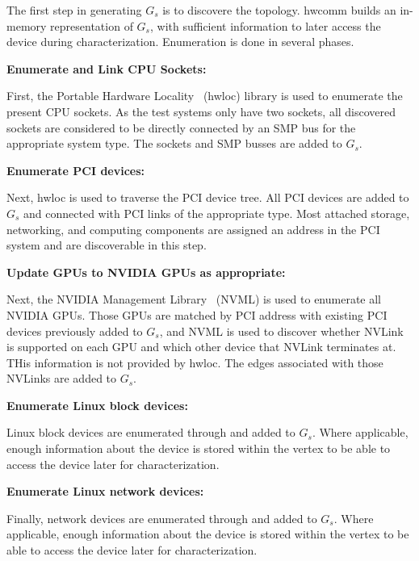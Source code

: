 The first step in generating $G_s$ is to discovere the topology.
hwcomm builds an in-memory representation of $G_s$, with sufficient information to later access the device during characterization.
Enumeration is done in several phases.

\textbf{Enumerate and Link CPU Sockets:}

First, the Portable Hardware Locality~\cite{broquedis2010hwloc} (hwloc) library is used to enumerate the present CPU sockets.
As the test systems only have two sockets, all discovered sockets are considered to be directly connected by an SMP bus for the appropriate system type.
The sockets and SMP busses are added to $G_s$.

\textbf{Enumerate PCI devices:}

Next, hwloc is used to traverse the PCI device tree.
All PCI devices are added to $G_s$ and connected with PCI links of the appropriate type.
Most attached storage, networking, and computing components are assigned an address in the PCI system and are discoverable in this step.


\textbf{Update GPUs to NVIDIA GPUs as appropriate:}

Next, the NVIDIA Management Library~\cite{nvidia2017nvml} (NVML) is used to enumerate all NVIDIA GPUs.
Those GPUs are matched by PCI address with existing PCI devices previously added to $G_s$, and NVML is used to discover whether NVLink is supported on each GPU and which other device that NVLink terminates at.
THis information is not provided by hwloc.
The edges associated with those NVLinks are added to $G_s$.


\textbf{Enumerate Linux block devices:}

Linux block devices are enumerated through  and added to $G_s$.
Where applicable, enough information about the device is stored within the vertex to be able to access the device later for characterization.

\textbf{Enumerate Linux network devices:}

Finally, network devices are enumerated through  and added to $G_s$.
Where applicable, enough information about the device is stored within the vertex to be able to access the device later for characterization.

